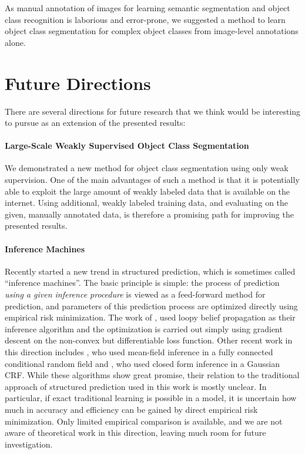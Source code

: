 \documentclass[12pt,toc=bibnumbered, a4paper,twoside,DIV=11,BCOR=.5cm]{scrbook}
\begin{document}
As manual annotation of images for learning semantic segmentation and object
class recognition is laborious and error-prone, we suggested a method to
learn object class segmentation for complex object classes from image-level
annotations alone.

\section{Future Directions}
There are several directions for future research that we think would be
interesting to pursue as an extension of the presented results:
\paragraph{Large-Scale Weakly Supervised Object Class Segmentation}
We demonstrated a new method for object class segmentation using only weak
supervision. One of the main advantages of such a method is that it is
potentially able to exploit the large amount of weakly labeled data that
is available on the internet. Using additional, weakly labeled training data,
and evaluating on the given, manually annotated data, is therefore a promising
path for improving the presented results.
\paragraph{Inference Machines}
Recently \citet{stoyanov2011empirical} started a new trend in structured
prediction, which is sometimes called ``inference machines''. The basic
principle is simple: the process of prediction \emph{using a given inference
procedure} is viewed as a feed-forward method for prediction, and parameters of this
prediction process are optimized directly using empirical risk minimization. The work of
\citet{stoyanov2011empirical}, used loopy belief propagation as their inference
algorithm and the optimization is carried out simply using gradient descent on
the non-convex but differentiable loss function.  Other recent work in this
direction includes \citet{krahenbuhlparameter}, who used mean-field inference
in a fully connected conditional random field and \citet{jancsarylearning}, who
used closed form inference in a Gaussian CRF\@.
While these algorithms show great promise, their relation to the traditional
approach of structured prediction used in this work is mostly unclear. In particular,
if exact traditional learning is possible in a model, it is uncertain how much
in accuracy and efficiency can be gained by direct empirical risk minimization.
Only limited empirical comparison is available, and we are not aware of theoretical
work in this direction, leaving much room for future investigation.
\end{document}
